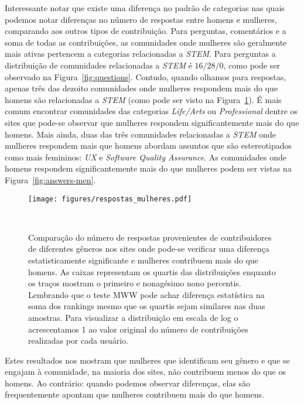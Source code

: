 Interessante notar que existe uma diferença no padrão de categorias nas quais podemos notar diferenças no número de respostas entre homens e mulheres, comparando aos outros tipos de contribuição. Para perguntas, comentários e a soma de todas as contribuições, as comunidades onde mulheres são geralmente mais ativas pertencem a categorias relacionadas a \emph{STEM}. Para perguntas a distribuição de comunidades relacionadas a \emph{STEM} é $16/28/0$, como pode ser observado na Figura~\ref{fig:questions}. Contudo, quando olhamos para respostas, apenas três das dezoito comunidades onde mulheres respondem mais do que homens são relacionadas a \emph{STEM} (como pode ser visto na Figura~\ref{fig:answers}). É mais comum encontrar comunidades das categorias \emph{Life/Arts} ou \emph{Professional} dentre os sites que pode-se observar que mulheres respondem significantemente mais do que homens. Mais ainda, duas das três comunidades relacionadas a \emph{STEM} onde mulheres respondem mais que homens abordam assuntos que são estereotipados como mais femininos: \emph{UX} e \textit{Software Quality Assurance}. As comunidades onde homens respondem significantemente mais do que mulheres podem ser vistas na Figura~\ref{fig:answers-men}.

\begin{figure}
  \centering
  \texttt{[image: figures/respostas\_mulheres.pdf]}
  \caption[Comparação do número de respostas em comunidades onde mulheres respondem mais.]{Comparação do número de respostas provenientes de contribuidores de diferentes gêneros nos sites onde pode-se verificar uma diferença estatisticamente significante e mulheres contribuem mais do que homens. As caixas representam os quartis das distribuições enquanto os traços mostram o primeiro e nonagésimo nono percentis. Lembrando que o teste MWW pode achar diferença estatística na soma dos rankings mesmo que os quartis sejam similares nas duas amostras. Para visualizar a distribuição em escala de log o acrescentamos 1 ao valor original do número de contribuições realizadas por cada usuário.}~\label{fig:answers}
\end{figure}


Estes resultados nos mostram que mulheres que identificam seu gênero e que se engajam à comunidade, na maioria dos sites, não contribuem menos do que os homens. Ao contrário: quando podemos observar diferenças, elas são frequentemente apontam que mulheres contribuem mais do que homens.

